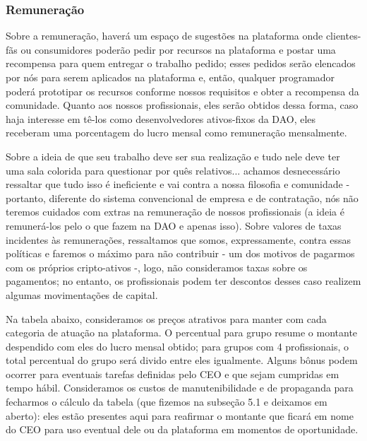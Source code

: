 \documentclass[onecolumn,12pt]{asme2ej}
\begin{document}
\subsubsection{Remuneração}

Sobre a remuneração, haverá um espaço de sugestões na plataforma onde clientes-fãs ou consumidores poderão pedir por recursos na plataforma e postar uma recompensa para quem entregar o trabalho pedido; esses pedidos serão elencados por nós para serem aplicados na plataforma e, então, qualquer programador poderá prototipar os recursos conforme nossos requisitos e obter a recompensa da comunidade. Quanto aos nossos profissionais, eles serão obtidos dessa forma, caso haja interesse em tê-los como desenvolvedores ativos-fixos da DAO, eles receberam uma porcentagem do lucro mensal como remuneração mensalmente. 

Sobre a ideia de que seu trabalho deve ser sua realização e tudo nele deve ter uma sala colorida para questionar por quês relativos... achamos desnecessário ressaltar que tudo isso é ineficiente e vai contra a nossa filosofia e comunidade - portanto, diferente do sistema convencional de empresa e de contratação, nós não teremos cuidados com extras na remuneração de nossos profissionais (a ideia é remunerá-los pelo o que fazem na DAO e apenas isso). Sobre valores de taxas incidentes às remunerações, ressaltamos que somos, expressamente, contra essas políticas e faremos o máximo para não contribuir - um dos motivos de pagarmos com os próprios cripto-ativos -, logo, não consideramos taxas sobre os pagamentos; no entanto, os profissionais podem ter descontos desses caso realizem algumas movimentações de capital.

Na tabela abaixo, consideramos os preços atrativos para manter com cada categoria de atuação na plataforma. O percentual para grupo resume o montante despendido com eles do lucro mensal obtido; para grupos com 4 profissionais, o total percentual do grupo será divido entre eles igualmente. Alguns bônus podem ocorrer para eventuais tarefas definidas pelo CEO e que sejam cumpridas em tempo hábil. Consideramos os custos de manutenibilidade e de propaganda para fecharmos o cálculo da tabela (que fizemos na subseção 5.1 e deixamos em aberto): eles estão presentes aqui para reafirmar o montante que ficará em nome do CEO para uso eventual dele ou da plataforma em momentos de oportunidade.
\end{document}
